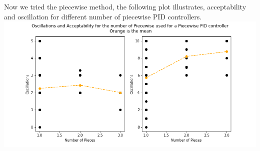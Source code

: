\documentclass[12pt]{article}
\begin{document}
\begin{multicols}{2}
Now we tried the piecewise method, the following plot illustrates, acceptability and oscillation for different number of piecewise PID controllers.
\includegraphics*[scale=0.3]{PiecewiseOscilationsAcceptability.png}


\end{multicols}
\end{document}
